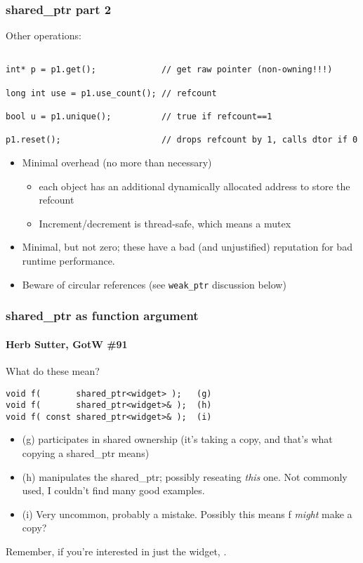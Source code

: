 \begin{frame}[fragile]
\frametitle{shared\_ptr part 2}

Other operations:
{\scriptsize\begin{verbatim}

int* p = p1.get();             // get raw pointer (non-owning!!!)

long int use = p1.use_count(); // refcount

bool u = p1.unique();          // true if refcount==1

p1.reset();                    // drops refcount by 1, calls dtor if 0
\end{verbatim}
}



\begin{itemize}
\pause{}
\item Minimal overhead (no more than necessary)
\begin{itemize}
  \item each object has an additional dynamically allocated address to
    store the refcount
  \item Increment/decrement is thread-safe, which means a mutex
\end{itemize}
\pause{}
\item Minimal, but not zero; these have a bad (and unjustified)
  reputation for bad runtime performance.
\vskip 12pt
\pause{}
\item Beware of circular references (see \texttt{weak\_ptr} discussion below)
\end{itemize}
\end{frame}


\begin{frame}[fragile]
\frametitle{shared\_ptr as function argument}
\framesubtitle{Herb Sutter, GotW \#91}
What do these mean?
{\scriptsize\begin{verbatim}
void f(       shared_ptr<widget> );   (g)
void f(       shared_ptr<widget>& );  (h)
void f( const shared_ptr<widget>& );  (i)
\end{verbatim}
}
\begin{itemize}
\pause{}
\item (g) participates in shared ownership (it's taking a copy, and that's what
  copying a shared\_ptr means)
\pause{}
\item (h) manipulates the shared\_ptr; possibly reseating \emph{this}
  one.  Not commonly used, I couldn't find many good examples.
\pause{}
\item (i) Very uncommon, probably a mistake.  Possibly this means f \emph{might} make a copy?
\end{itemize}
\vskip 12pt
\pause{}
Remember, if you're interested in just the widget, .


\end{frame}

